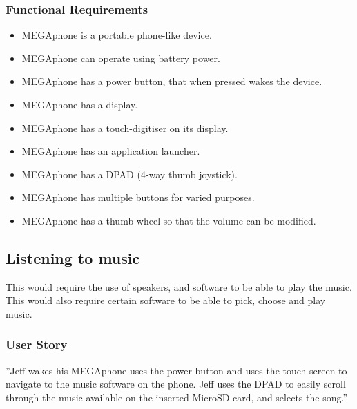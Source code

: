         \subsubsection{Functional Requirements}
        \begin{itemize}
        \item MEGAphone is a portable phone-like device.
        \item MEGAphone can operate using battery power.
        \item MEGAphone has a power button, that when pressed wakes the device.
        \item MEGAphone has a display.
        \item MEGAphone has a touch-digitiser on its display.
        \item MEGAphone has an application launcher.
        \item MEGAphone has a DPAD (4-way thumb joystick).
        \item MEGAphone has multiple buttons for varied purposes.
	\item MEGAphone has a thumb-wheel so that the volume can be modified.
        \end{itemize}

\subsection{Listening to music}
	This would require the use of speakers, and software to be able to play the music. This would also require certain software to be able to pick, choose and play music.\\

	\subsubsection{User Story}
	''Jeff wakes his MEGAphone uses the power button and uses the touch screen to navigate to the music software on the phone. Jeff uses the DPAD to easily scroll through the music available on the inserted MicroSD card, and selects the song.''

